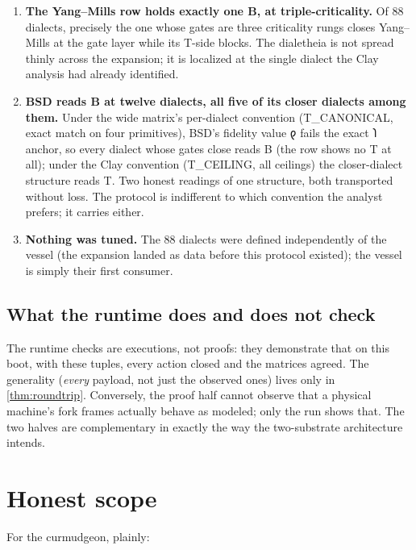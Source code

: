\documentclass[12pt,a4paper]{article}
\newcommand{\shav}[1]{{\shavfont #1}}
\newcommand{\bT}{\textsf{T}}
\newcommand{\bB}{\textsf{B}}
\begin{document}
\begin{enumerate}
\item \textbf{The Yang--Mills row holds exactly one \bB{}, at
triple-criticality.} Of $88$ dialects, precisely the one whose gates are
three criticality rungs closes Yang--Mills at the gate layer while its
T-side blocks. The dialetheia is not spread thinly across the expansion;
it is localized at the single dialect the Clay analysis had already
identified.
\item \textbf{BSD reads \bB{} at twelve dialects, all five of its closer
dialects among them.}
Under the wide matrix's per-dialect convention (T\_CANONICAL, exact
match on four primitives), BSD's fidelity value \shav{𐑞} fails the exact
\shav{𐑐} anchor, so every dialect whose gates close reads \bB{} (the
row shows no \bT{} at all); under the Clay convention (T\_CEILING, all
ceilings) the closer-dialect structure reads \bT{}. Two honest readings of one structure, both transported without
loss. The protocol is indifferent to which convention the analyst
prefers; it carries either.
\item \textbf{Nothing was tuned.} The $88$ dialects were defined
independently of the vessel (the expansion landed as data before this
protocol existed); the vessel is simply their first consumer.
\end{enumerate}

\subsection{What the runtime does and does not check}

The runtime checks are executions, not proofs: they demonstrate that on
this boot, with these tuples, every action closed and the matrices agreed.
The generality (\emph{every} payload, not just the observed ones) lives
only in \cref{thm:roundtrip}. Conversely, the proof half cannot observe
that a physical machine's fork frames actually behave as modeled; only the
run shows that. The two halves are complementary in exactly the way the
two-substrate architecture intends.

\section{Honest scope}
\label{sec:scope}

For the curmudgeon, plainly:
\end{document}
